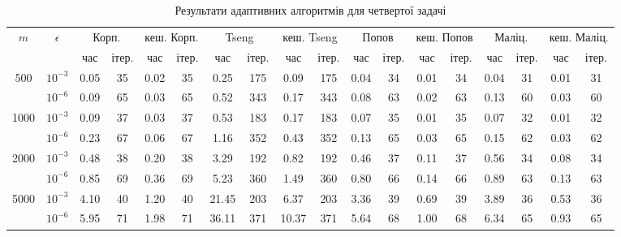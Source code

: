 \begin{table}[H]
    \centering
    \begin{tabular}{||c|c||c|c|c|c||c|c|c|c||c|c|c|c||c|c|c|c||} \hline \hline
        \multirow{2}{*}{$m$} & \multirow{2}{*}{$\epsilon$} & \multicolumn{2}{c|}{Корп.} & \multicolumn{2}{c||}{кеш. Корп.} & \multicolumn{2}{c|}{Tseng} & \multicolumn{2}{c||}{кеш. Tseng} & \multicolumn{2}{c|}{Попов} & \multicolumn{2}{c||}{кеш. Попов} & \multicolumn{2}{c|}{Маліц.} & \multicolumn{2}{c||}{кеш. Маліц.} \\ \cline{3-18}
        & & час & ітер. & час & ітер. & час & ітер. & час & ітер. & час & ітер. & час & ітер. & час & ітер. & час & ітер. \\ \hline \hline
        \multirow{2}{*}{500} & $10^{-3}$ & 0.05 & 35 & 0.02 & 35 & 0.25 & 175 & 0.09 & 175 & 0.04 & 34 & 0.01 & 34 & 0.04 & 31 & 0.01 & 31 \\ \cline{2-18}
        & $10^{-6}$ & 0.09 & 65 & 0.03 & 65 & 0.52 & 343 & 0.17 & 343 & 0.08 & 63 & 0.02 & 63 & 0.13 & 60 & 0.03 & 60 \\ \hline
        \multirow{2}{*}{1000} & $10^{-3}$ & 0.09 & 37 & 0.03 & 37 & 0.53 & 183 & 0.17 & 183 & 0.07 & 35 & 0.01 & 35 & 0.07 & 32 & 0.01 & 32 \\ \cline{2-18}
        & $10^{-6}$ & 0.23 & 67 & 0.06 & 67 & 1.16 & 352 & 0.43 & 352 & 0.13 & 65 & 0.03 & 65 & 0.15 & 62 & 0.03 & 62 \\ \hline
        \multirow{2}{*}{2000} & $10^{-3}$ & 0.48 & 38 & 0.20 & 38 & 3.29 & 192 & 0.82 & 192 & 0.46 & 37 & 0.11 & 37 & 0.56 & 34 & 0.08 & 34 \\ \cline{2-18}
        & $10^{-6}$ & 0.85 & 69 & 0.36 & 69 & 5.23 & 360 & 1.49 & 360 & 0.80 & 66 & 0.14 & 66 & 0.89 & 63 & 0.13 & 63 \\ \hline
        \multirow{2}{*}{5000} & $10^{-3}$ & 4.10 & 40 & 1.20 & 40 & 21.45 & 203 & 6.37 & 203 & 3.36 & 39 & 0.69 & 39 & 3.89 & 36 & 0.53 & 36 \\ \cline{2-18}
        & $10^{-6}$ & 5.95 & 71 & 1.98 & 71 & 36.11 & 371 & 10.37 & 371 & 5.64 & 68 & 1.00 & 68 & 6.34 & 65 & 0.93 & 65 \\ \hline
        \hline
    \end{tabular}
    \caption{Результати адаптивних алгоритмів для четвертої задачі}
    \label{tab:4-adapt}
\end{table}
